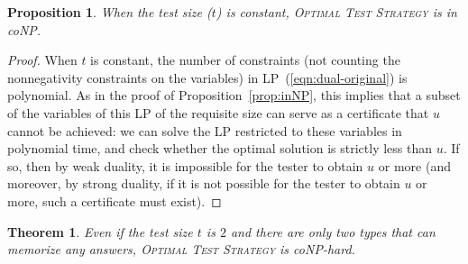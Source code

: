 \documentclass{article}
\newtheorem{theorem}{Theorem}
\newtheorem{proposition}{Proposition}
\begin{document}
\begin{proposition}
  When the test size ($t$) is constant, \textsc{Optimal
    Test Strategy} is in coNP.
\end{proposition}
\begin{proof}
  When $t$ is constant, the number of constraints (not counting the
  nonnegativity constraints on the variables) in
  LP~(\ref{eqn:dual-original}) is polynomial.  As in the proof of
  Proposition~\ref{prop:inNP}, this implies that a subset of the variables
  of this LP of the requisite size can serve as a certificate that $u$
  cannot be achieved:  we can
  solve the LP restricted to these variables in polynomial time, and check
  whether the optimal solution is strictly less than $u$.  If so, then by
  weak duality, it is impossible for the tester to obtain $u$ or more (and
  moreover, by strong duality, if it is not possible for the tester to
  obtain $u$ or more, such a certificate must exist).
\end{proof}


\begin{theorem}\label{thm:memorize-hardness}
Even if the test size $t$ is $2$ and there are only two types that can
memorize any answers, \textsc{Optimal Test Strategy} is
coNP-hard.
\end{theorem}
\end{document}
